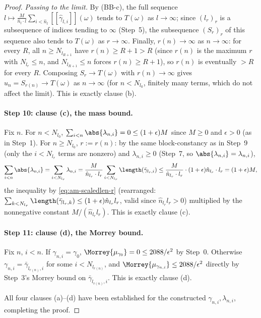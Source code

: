 \begin{proof}
  \emph{Passing to the limit.} By (BB-c), the full sequence
  $l\mapsto\frac M{\hat n_l\cdot l}\sum_{i<\hat n_l}[[\hat\gamma_{l,i}]](\omega)$ tends to $T(\omega)$
  as $l\to\infty$; since $(l_r)_r$ is a subsequence of indices tending to $\infty$ (Step~5), the
  subsequence $(S_r)_r$ of this sequence also tends to $T(\omega)$ as $r\to\infty$. Finally,
  $r(n)\to\infty$ as $n\to\infty$: for every $R$, all $n\ge N_{l_{R+1}}$ have $r(n)\ge R+1>R$ (since
  $r(n)$ is the maximum $r$ with $N_{l_r}\le n$, and $N_{l_{R+1}}\le n$ forces $r(n)\ge R+1$), so
  $r(n)$ is eventually $>R$ for every $R$. Composing $S_r\to T(\omega)$ with $r(n)\to\infty$ gives
  $u_n=S_{r(n)}\to T(\omega)$ as $n\to\infty$ (for $n<N_{l_0}$, finitely many terms, which do not
  affect the limit). This is exactly clause (b).

  \paragraph{Step 10: clause (c), the mass bound.} Fix $n$. For $n<N_{l_0}$,
  $\sum_{i<n}\abs{\lambda_{n,i}}=0\le(1+\epsilon)M$ since $M\ge0$ and $\epsilon>0$ (as in Step~1).
  For $n\ge N_{l_0}$, $r:=r(n)$: by the same block-constancy as in Step~9 (only the $i<N_{l_r}$
  terms are nonzero) and $\lambda_{n,i}\ge0$ (Step~7, so $\abs{\lambda_{n,i}}=\lambda_{n,i}$),
  \[
    \sum_{i<n}\abs{\lambda_{n,i}} = \sum_{i<N_{l_r}}\lambda_{n,i}
    = \frac M{\hat n_{l_r}\cdot l_r}\sum_{i<N_{l_r}}\length(\bar\gamma_{l_r,i})
    \le \frac M{\hat n_{l_r}\cdot l_r}\cdot(1+\epsilon)\hat n_{l_r}\cdot l_r
    = (1+\epsilon) M
    ,
  \]
  the inequality by \eqref{eq:am-scaledlen-r} (rearranged: $\sum_{k<N_{l_r}}\length(\bar\gamma_{l_r,k})
  \le(1+\epsilon)\hat n_{l_r}l_r$, valid since $\hat n_{l_r}l_r>0$) multiplied by the nonnegative
  constant $M/(\hat n_{l_r}l_r)$. This is exactly clause (c).

  \paragraph{Step 11: clause (d), the Morrey bound.} Fix $n$, $i<n$. If $\gamma_{n,i}=\gamma_0$,
  $\Morrey{\mu_{\gamma_0}}=0\le2088/\epsilon^2$ by Step~0. Otherwise $\gamma_{n,i}=
  \bar\gamma_{l_{r(n)},i}$ for some $i<N_{l_{r(n)}}$, and $\Morrey{\mu_{\gamma_{n,i}}}\le
  2088/\epsilon^2$ directly by Step~3's Morrey bound on $\bar\gamma_{l_{r(n)},i}$. This is exactly
  clause (d).

  All four clauses (a)--(d) have been established for the constructed $\gamma_{n,i},\lambda_{n,i}$,
  completing the proof.
\end{proof}
